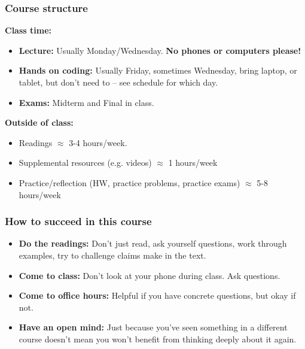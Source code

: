 \documentclass[serif,mathserif]{beamer}
\begin{document}
\begin{frame}
\frametitle{Course structure}

{\bf Class time:} 
\begin{itemize}
\item {\bf Lecture:} Usually Monday/Wednesday. {\bf No phones or computers please!}
\item {\bf Hands on coding:} Usually Friday, sometimes Wednesday, bring laptop, or tablet, but don't need to -- see schedule for which day. 
\item {\bf Exams:} Midterm and Final in class. 
\end{itemize}


\pause 
{\bf Outside of class:} 
\begin{itemize}
\item Readings $\approx$ 3-4 hours/week. 
\item Supplemental resources (e.g. videos) $\approx$ 1 hours/week
\item Practice/reflection (HW, practice problems, practice exams) $\approx$ 5-8 hours/week 
\end{itemize}


\end{frame}



\begin{frame} 
\frametitle{How to succeed in this course}
\begin{itemize}
\item {\bf Do the readings:} Don't just read, ask yourself questions, work through examples, try to challenge claims make in the text. 
\item {\bf Come to class:} Don't look at your phone during class. Ask questions. 
\item {\bf Come to office hours:} Helpful if you have concrete questions, but okay if not. 
\item {\bf Have an open mind:} Just because you've seen something in a different course doesn't mean you won't benefit from thinking deeply about it again. 
\end{itemize}

\end{frame}
\end{document}
